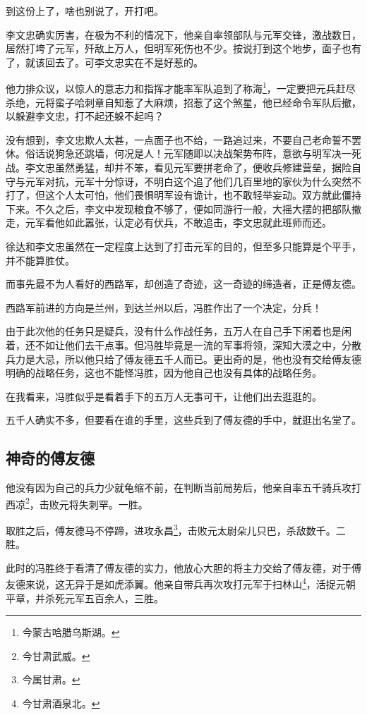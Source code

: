 \begin{multicols}{\theparacolNo}
		到这份上了，啥也别说了，开打吧。

		李文忠确实厉害，在极为不利的情况下，他亲自率领部队与元军交锋，激战数日，居然打垮了元军，歼敌上万人，但明军死伤也不少。按说打到这个地步，面子也有了，就该回去了。可李文忠实在不是好惹的。

		他力排众议，以惊人的意志力和指挥才能率军队追到了称海\footnote{今蒙古哈腊乌斯湖。}，一定要把元兵赶尽杀绝，元将蛮子哈刺章自知惹了大麻烦，招惹了这个煞星，他已经命令军队后撤，以躲避李文忠，打不起还躲不起吗？

		没有想到，李文忠欺人太甚，一点面子也不给，一路追过来，不要自己老命誓不罢休。俗话说狗急还跳墙，何况是人！元军随即以决战架势布阵，意欲与明军决一死战。李文忠虽然勇猛，却并不笨，看见元军要拼老命了，便收兵修建营垒，据险自守与元军对抗，元军十分惊讶，不明白这个追了他们几百里地的家伙为什么突然不打了，但这个人太可怕，他们畏惧明军设有诡计，也不敢轻举妄动。双方就此僵持下来。不久之后，李文中发现粮食不够了，便如同游行一般，大摇大摆的把部队撤走，元军看他如此嚣张，认定必有伏兵，不敢追击，李文忠就此班师而还。

		徐达和李文忠虽然在一定程度上达到了打击元军的目的，但至多只能算是个平手，并不能算胜仗。

		而事先最不为人看好的西路军，却创造了奇迹，这一奇迹的缔造者，正是傅友德。

		西路军前进的方向是兰州，到达兰州以后，冯胜作出了一个决定，分兵！

		由于此次他的任务只是疑兵，没有什么作战任务，五万人在自己手下闲着也是闲着，还不如让他们去干点事。但冯胜毕竟是一流的军事将领，深知大漠之中，分散兵力是大忌，所以他只给了傅友德五千人而已。更出奇的是，他也没有交给傅友德明确的战略任务，这也不能怪冯胜，因为他自己也没有具体的战略任务。

		在我看来，冯胜似乎是看着手下的五万人无事可干，让他们出去逛逛的。

		五千人确实不多，但要看在谁的手里，这些兵到了傅友德的手中，就逛出名堂了。

		\subsection{神奇的傅友德}
		他没有因为自己的兵力少就龟缩不前，在判断当前局势后，他亲自率五千骑兵攻打西凉\footnote{今甘肃武威。}，击败元将失刺罕。一胜。

		取胜之后，傅友德马不停蹄，进攻永昌\footnote{今属甘肃。}，击败元太尉朵儿只巴，杀敌数千。二胜。

		此时的冯胜终于看清了傅友德的实力，他放心大胆的将主力交给了傅友德，对于傅友德来说，这无异于是如虎添翼。他亲自带兵再次攻打元军于扫林山\footnote{今甘肃酒泉北。}，活捉元朝平章，并杀死元军五百余人，三胜。


\end{multicols}
